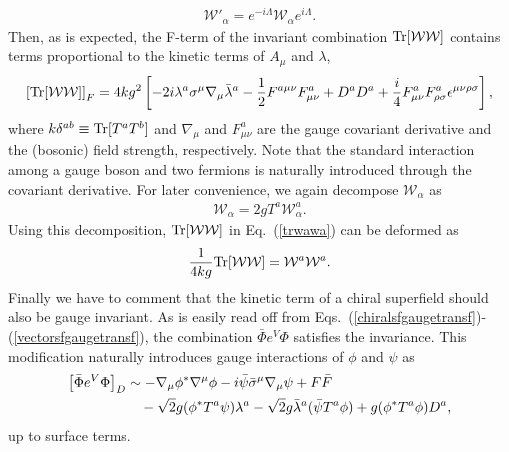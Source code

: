 \documentclass[12pt,twoside,book]{article}
\begin{document}
\begin{align}
 \mathcal{W}'_\alpha = e^{-i\Lambda} \mathcal{W}_\alpha e^{i\Lambda}.
\end{align}
Then, as is expected, the F-term of the invariant combination ${\rm
Tr}[\mathcal{W}\mathcal{W}]$ contains terms proportional to the
kinetic terms of $A_\mu$ and $\lambda$,
\begin{align}
 \left[ {\rm Tr}[\mathcal{W}\mathcal{W}] \right]_F = 4kg^2 \left[
 -2i\lambda^a \sigma^\mu \nabla_\mu \bar{\lambda}^a - \frac{1}{2}
 F^{a\mu\nu} F^a_{\mu\nu} + D^a D^a + \frac{i}{4} F^a_{\mu\nu}
 F^a_{\rho \sigma} \epsilon^{\mu\nu\rho\sigma} \right],\label{trwawa}
\end{align}
where $k\delta^{ab} \equiv {\rm Tr}[T^a T^b]$ and $\nabla_\mu$ and
$F^a_{\mu\nu}$ are the gauge covariant derivative and the (bosonic)
field strength, respectively.  Note that the standard interaction among
a gauge boson and two fermions is naturally introduced through the
covariant derivative.  For later convenience, we again decompose
$\mathcal{W}_\alpha$ as
\begin{align}
 \mathcal{W}_\alpha = 2g T^a \mathcal{W}^a_\alpha.
\end{align}
Using this decomposition, ${\rm Tr}[\mathcal{W}\mathcal{W}]$ in Eq.\
(\ref{trwawa}) can be deformed as
\begin{align}
 \frac{1}{4kg} {\rm Tr}[\mathcal{W}\mathcal{W}] = \mathcal{W}^a
 \mathcal{W}^a.
\end{align}
Finally we have to comment that the kinetic
term of a chiral superfield should also be gauge invariant.  As is
easily read off from Eqs.\
(\ref{chiralsfgaugetransf})-(\ref{vectorsfgaugetransf}), the
combination $\bar{\Phi} e^V \Phi$ satisfies the invariance.  This
modification naturally introduces gauge interactions of $\phi$ and
$\psi$ as
\begin{align}
 \left[ \bar{\Phi} e^V \Phi \right]_D &\sim -\nabla_\mu \phi^{*}
 \nabla^\mu \phi -i \bar{\psi} \bar{\sigma}^\mu \nabla_\mu \psi +
 F\bar{F} \notag \\
 &\quad -\sqrt{2} g(\phi^{*} T^a \psi) \lambda^a - \sqrt{2} g
 \bar{\lambda}^a (\bar{\psi} T^a \phi) + g(\phi^{*} T^a \phi) D^a,\label{chiralkinetic}
\end{align}
up to surface terms.
\end{document}

